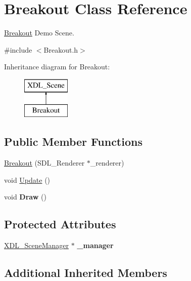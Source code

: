 \hypertarget{class_breakout}{\section{Breakout Class Reference}
\label{class_breakout}
}


\hyperlink{class_breakout}{Breakout} Demo Scene.  




{\ttfamily \#include $<$Breakout.\-h$>$}

Inheritance diagram for Breakout\-:\begin{figure}[H]
\begin{center}
\leavevmode
\includegraphics[height=2.000000cm]{class_breakout}
\end{center}
\end{figure}
\subsection*{Public Member Functions}
\begin{DoxyCompactItemize}
\item 
\hyperlink{class_breakout_a1de3e33de09b958a21855ba83685edd9}{Breakout} (S\-D\-L\-\_\-\-Renderer $\ast$\-\_\-renderer)
\item 
void \hyperlink{class_breakout_a5cf62499794bf0613399e64da15b7cdc}{Update} ()
\item 
\hypertarget{class_breakout_a3899a6799cf64eb53e862aaab1b2b4a1}{void {\bfseries Draw} ()}\label{class_breakout_a3899a6799cf64eb53e862aaab1b2b4a1}

\end{DoxyCompactItemize}
\subsection*{Protected Attributes}
\begin{DoxyCompactItemize}
\item 
\hypertarget{class_breakout_a59dfd5c0fcf89b8dc1b85fb25d141e89}{\hyperlink{class_x_d_l___scene_manager}{X\-D\-L\-\_\-\-Scene\-Manager} $\ast$ {\bfseries \-\_\-manager}}\label{class_breakout_a59dfd5c0fcf89b8dc1b85fb25d141e89}

\end{DoxyCompactItemize}
\subsection*{Additional Inherited Members}


